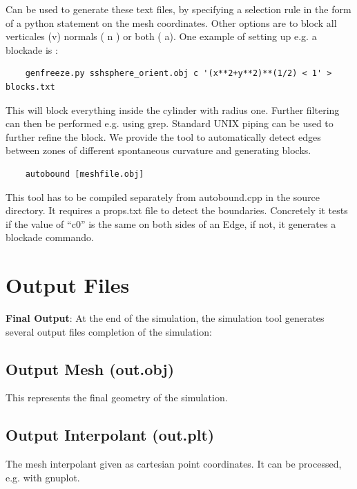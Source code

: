 \documentclass[11pt]{article}
\begin{document}
Can be used to generate these text files, by specifying a selection rule in the form of a python statement on the mesh coordinates. Other options are to block all verticales (v) normals ( n ) or both ( a). One example of setting up e.g. a blockade is :

\begin{verbatim}
    genfreeze.py sshsphere_orient.obj c '(x**2+y**2)**(1/2) < 1' > blocks.txt
\end{verbatim}%

This will block everything inside the cylinder with radius one. Further filtering can then be performed e.g. using grep. Standard UNIX piping can be used to further refine the block.
We provide the tool to automatically detect edges between zones of different spontaneous curvature and generating blocks.

\begin{verbatim}
    autobound [meshfile.obj]
\end{verbatim}%

This tool has to be compiled separately from autobound.cpp in the source directory. It requires a props.txt file to detect the boundaries. Concretely it tests if the value of ``c0'' is the same on both sides of an Edge, if not, it generates a blockade commando.

\section{Output Files}

\textbf{Final Output}:
At the end of the simulation, the simulation tool generates several output files completion of the simulation:

\subsection{Output Mesh (out.obj)}
This represents the final geometry of the simulation.

\subsection{Output Interpolant (out.plt)}
The mesh interpolant given as cartesian point coordinates. It can be processed, e.g. with gnuplot.
\end{document}
